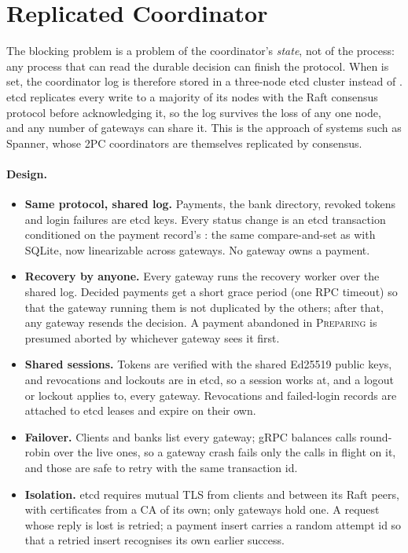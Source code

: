 \documentclass[11pt]{article}
\newcommand{\code}[1]{\texttt{\detokenize{#1}}}
\newcommand{\st}[1]{\textsc{#1}}
\begin{document}
\section{Replicated Coordinator}
\label{sec:replicated}
The blocking problem is a problem of the coordinator's \emph{state}, not of
the process: any process that can read the durable decision can finish the
protocol. When \code{PG_ETCD_ENDPOINTS} is set, the coordinator log is
therefore stored in a three-node etcd cluster instead of \code{gateway.db}.
etcd replicates every write to a majority of its nodes with the Raft
consensus protocol before acknowledging it, so the log survives the loss of
any one node, and any number of gateways can share it. This is the approach
of systems such as Spanner, whose 2PC coordinators are themselves replicated
by consensus.

\paragraph{Design.}
\begin{itemize}
  \item \textbf{Same protocol, shared log.} Payments, the bank directory,
        revoked tokens and login failures are etcd keys. Every status change
        is an etcd transaction conditioned on the payment record's
        \code{mod_revision}: the same compare-and-set as with SQLite, now
        linearizable across gateways. No gateway owns a payment.
  \item \textbf{Recovery by anyone.} Every gateway runs the recovery worker
        over the shared log. Decided payments get a short grace period (one
        RPC timeout) so that the gateway running them is not duplicated by the
        others; after that, any gateway resends the decision. A payment
        abandoned in \st{Preparing} is presumed aborted by whichever gateway
        sees it first.
  \item \textbf{Shared sessions.} Tokens are verified with the shared
        Ed25519 public keys, and revocations and lockouts are in etcd, so a
        session works at, and a logout or lockout applies to, every gateway.
        Revocations and failed-login records are attached to etcd leases and
        expire on their own.
  \item \textbf{Failover.} Clients and banks list every gateway; gRPC balances
        calls round-robin over the live ones, so a gateway crash fails only
        the calls in flight on it, and those are safe to retry with the same
        transaction id.
  \item \textbf{Isolation.} etcd requires mutual TLS from clients and between
        its Raft peers, with certificates from a CA of its own; only gateways
        hold one. A request whose reply is lost is retried; a payment insert
        carries a random attempt id so that a retried insert recognises its
        own earlier success.
\end{itemize}
\end{document}
